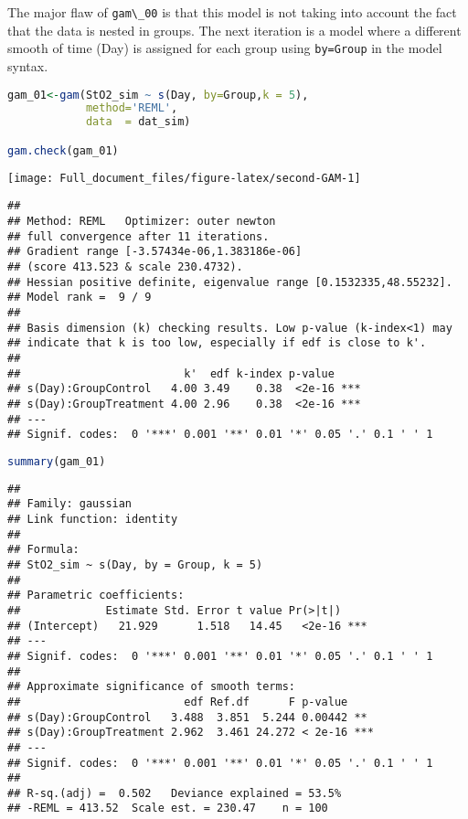 \documentclass[
]{article}
\newcommand{\passthrough}[1]{#1}
\begin{document}
The major flaw of \passthrough{\lstinline!gam\_00!} is that this model is not taking into account the fact that the data is nested in groups. The next iteration is a model where a different smooth of time (Day) is assigned for each group using \passthrough{\lstinline!by=Group!} in the model syntax.

\begin{lstlisting}[language=R]
gam_01<-gam(StO2_sim ~ s(Day, by=Group,k = 5),
            method='REML',
            data  = dat_sim)

gam.check(gam_01)
\end{lstlisting}

\texttt{[image: Full\_document\_files/figure-latex/second-GAM-1]}

\begin{lstlisting}
## 
## Method: REML   Optimizer: outer newton
## full convergence after 11 iterations.
## Gradient range [-3.57434e-06,1.383186e-06]
## (score 413.523 & scale 230.4732).
## Hessian positive definite, eigenvalue range [0.1532335,48.55232].
## Model rank =  9 / 9 
## 
## Basis dimension (k) checking results. Low p-value (k-index<1) may
## indicate that k is too low, especially if edf is close to k'.
## 
##                         k'  edf k-index p-value    
## s(Day):GroupControl   4.00 3.49    0.38  <2e-16 ***
## s(Day):GroupTreatment 4.00 2.96    0.38  <2e-16 ***
## ---
## Signif. codes:  0 '***' 0.001 '**' 0.01 '*' 0.05 '.' 0.1 ' ' 1
\end{lstlisting}

\begin{lstlisting}[language=R]
summary(gam_01)
\end{lstlisting}

\begin{lstlisting}
## 
## Family: gaussian 
## Link function: identity 
## 
## Formula:
## StO2_sim ~ s(Day, by = Group, k = 5)
## 
## Parametric coefficients:
##             Estimate Std. Error t value Pr(>|t|)    
## (Intercept)   21.929      1.518   14.45   <2e-16 ***
## ---
## Signif. codes:  0 '***' 0.001 '**' 0.01 '*' 0.05 '.' 0.1 ' ' 1
## 
## Approximate significance of smooth terms:
##                         edf Ref.df      F p-value    
## s(Day):GroupControl   3.488  3.851  5.244 0.00442 ** 
## s(Day):GroupTreatment 2.962  3.461 24.272 < 2e-16 ***
## ---
## Signif. codes:  0 '***' 0.001 '**' 0.01 '*' 0.05 '.' 0.1 ' ' 1
## 
## R-sq.(adj) =  0.502   Deviance explained = 53.5%
## -REML = 413.52  Scale est. = 230.47    n = 100
\end{lstlisting}
\end{document}
